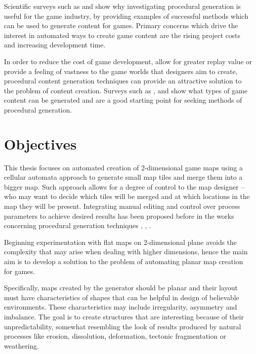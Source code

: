 \documentclass[12pt]{report}
\begin{document}
Scientific surveys such as \autocite{hendrikx2013procedural} and \autocite{smelik2009survey} show why investigating procedural generation is useful for the game industry, by providing examples of successful methods which can be used to generate content for games. Primary concerns which drive the interest in automated ways to create game content are the rising project costs and increasing development time.

In order to reduce the cost of game development, allow for greater replay value or provide a feeling of vastness to the game worlds that designers aim to create, procedural content generation techniques can provide an attractive solution to the problem of content creation. Surveys such as \autocite{hendrikx2013procedural}, \autocite{togelius2011search} and \autocite{de2011survey} show what types of game content can be generated and are a good starting point for seeking methods of procedural generation.
 
\section{Objectives}

This thesis focuses on automated creation of 2-dimensional game maps using a cellular automata approach to generate small map tiles and merge them into a bigger map. Such approach allows for a degree of control to the map designer -- who may want to decide which tiles will be merged and at which locations in the map they will be present. Integrating manual editing and control over process parameters to achieve desired results has been proposed before in the works concerning procedural generation techniques \autocite{bidarra2010integrating}, \autocite{smelik2010integrating}, \autocite{smelik2011declarative}. 

Beginning experimentation with flat maps on 2-dimensional plane avoids the complexity that may arise when dealing with higher dimensions, hence the main aim is to develop a solution to the problem of automating planar map creation for games. 

Specifically, maps created by the generator should be planar and their layout must have characteristics of shapes that can be helpful in design of believable environments. These characteristics may include irregularity, asymmetry and imbalance. The goal is to create structures that are interesting because of their unpredictability, somewhat resembling the look of results produced by natural processes like erosion, dissolution, deformation, tectonic fragmentation or weathering.
 
\end{document}
